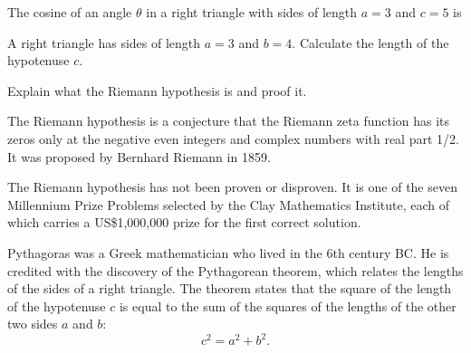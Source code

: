 \begin{questions}

  \question [2] The cosine of an angle $\theta$ in a right triangle with sides of length $a = 3$ and $c = 5$ is
  \begin{checkboxes}
  \end{checkboxes}
  \question [1] 
  A right triangle has sides of length $a = 3$ and $b = 4$. Calculate the length of the hypotenuse $c$.
  \answerline

  \question [3]
  Explain what the Riemann hypothesis is and proof it.
  \begin{solutionorbox}[4cm] %
    The Riemann hypothesis is a conjecture that the Riemann zeta function has its zeros only at the negative even integers and complex numbers with real part 1/2. It was proposed by Bernhard Riemann in 1859.

    The Riemann hypothesis has not been proven or disproven. It is one of the seven Millennium Prize Problems selected by the Clay Mathematics Institute, each of which carries a US\$1,000,000 prize for the first correct solution.
  \end{solutionorbox}

  \examnewpage

  
  \question

  Pythagoras was a Greek mathematician who lived in the 6th century BC. He is credited with the discovery of the Pythagorean theorem, which relates the lengths of the sides of a right triangle. The theorem states that the square of the length of the hypotenuse $c$ is equal to the sum of the squares of the lengths of the other two sides $a$ and $b$:
  \begin{equation}
    c^2 = a^2 + b^2.
    \label{eq:pythagoras}
  \end{equation}
  
  \begin{parts}

\end{parts}
\end{questions}
